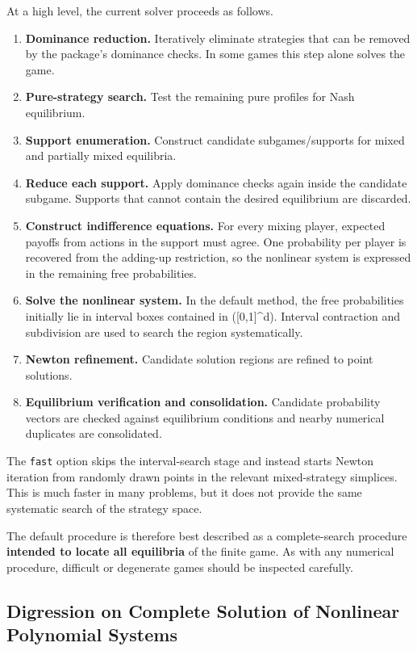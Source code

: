 \documentclass[11pt]{article}
\begin{document}
At a high level, the current solver proceeds as follows.

\begin{enumerate}
\def\labelenumi{\arabic{enumi}.}
\item
  \textbf{Dominance reduction.} Iteratively eliminate strategies that
  can be removed by the package's dominance checks. In some games this
  step alone solves the game.
\item
  \textbf{Pure-strategy search.} Test the remaining pure profiles for
  Nash equilibrium.
\item
  \textbf{Support enumeration.} Construct candidate subgames/supports
  for mixed and partially mixed equilibria.
\item
  \textbf{Reduce each support.} Apply dominance checks again inside the
  candidate subgame. Supports that cannot contain the desired
  equilibrium are discarded.
\item
  \textbf{Construct indifference equations.} For every mixing player,
  expected payoffs from actions in the support must agree. One
  probability per player is recovered from the adding-up restriction, so
  the nonlinear system is expressed in the remaining free probabilities.
\item
  \textbf{Solve the nonlinear system.} In the default method, the free
  probabilities initially lie in interval boxes contained in
  ({[}0,1{]}\^{}d). Interval contraction and subdivision are used to
  search the region systematically.
\item
  \textbf{Newton refinement.} Candidate solution regions are refined to
  point solutions.
\item
  \textbf{Equilibrium verification and consolidation.} Candidate
  probability vectors are checked against equilibrium conditions and
  nearby numerical duplicates are consolidated.
\end{enumerate}

The \texttt{fast} option skips the interval-search stage and instead
starts Newton iteration from randomly drawn points in the relevant
mixed-strategy simplices. This is much faster in many problems, but it
does not provide the same systematic search of the strategy space.

The default procedure is therefore best described as a complete-search
procedure \textbf{intended to locate all equilibria} of the finite game.
As with any numerical procedure, difficult or degenerate games should be
inspected carefully.

    \hypertarget{digression-on-complete-solution-of-nonlinear-polynomial-systems}{%
\subsection{Digression on Complete Solution of Nonlinear Polynomial
Systems}\label{digression-on-complete-solution-of-nonlinear-polynomial-systems}}
\end{document}

